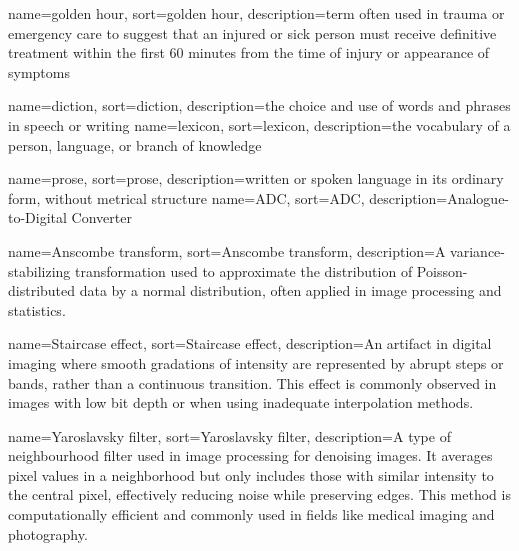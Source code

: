 

{
	name={golden hour},
	sort=golden hour,
	description={term often used in trauma or emergency care to suggest that an injured or sick person must receive definitive treatment within the first 60 minutes from the time of injury or appearance of symptoms}
}

{
	name={diction},
	sort=diction,
	description={the choice and use of words and phrases in speech or writing}
}
{
	name={lexicon},
	sort=lexicon,
	description={the vocabulary of a person, language, or branch of knowledge}
}

{
	name={prose},
	sort=prose,
	description={written or spoken language in its ordinary form, without metrical structure}
}
{
	name={ADC},
	sort=ADC,
	description={Analogue-to-Digital Converter}
}

{
	name={Anscombe transform},
	sort=Anscombe transform,
	description={A variance-stabilizing transformation used to approximate the distribution of Poisson-distributed data by a normal distribution, often applied in image processing and statistics.}
}

{
	name={Staircase effect},
	sort=Staircase effect,
	description={An artifact in digital imaging where smooth gradations of intensity are represented by abrupt steps or bands, rather than a continuous transition. This effect is commonly observed in images with low bit depth or when using inadequate interpolation methods.}
}

{
	name={Yaroslavsky filter},
	sort=Yaroslavsky filter,
	description={A type of neighbourhood filter used in image processing for denoising images. It averages pixel values in a neighborhood but only includes those with similar intensity to the central pixel, effectively reducing noise while preserving edges. This method is computationally efficient and commonly used in fields like medical imaging and photography.}
}


